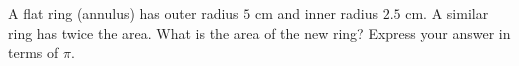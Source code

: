 A flat ring (annulus) has outer radius \(5\) cm and inner radius \(2.5\) cm. A similar ring has twice the area. What is the area of the new ring? Express your answer in terms of \(\pi\).
